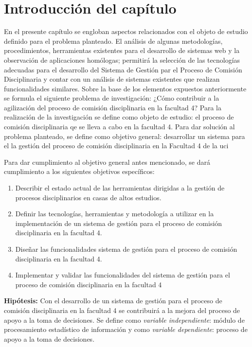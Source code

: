 \section[Introducción]{Introducción del capítulo}
En el presente capítulo se engloban aspectos relacionados con el objeto de estudio definido para el problema planteado. El análisis de algunas metodologías, procedimientos, herramientas existentes para el desarrollo de sistemas web y la observación de aplicaciones homólogas; permitirá la selección de las tecnologías adecuadas para el desarrollo del Sistema de Gestión par el Proceso de Comisión Disciplinaria y contar con un análisis de sistemas existentes que realizan funcionalidades similares.
Sobre la base de los elementos expuestos anteriormente se formula el siguiente problema de investigación: ¿Cómo contribuir a la agilización del proceso de comisión disciplinaria en la facultad 4? Para la realización de la investigación se define como objeto de estudio: el proceso de comisión disciplinaria qe se lleva a cabo en la facultad 4.
Para dar solución al problema planteado, se define como objetivo general: desarrollar un sistema para el la gestión del proceso de comisión disciplinaria en la Facultad 4 de la \ac{uci}

Para dar cumplimiento al objetivo general antes mencionado, se dará cumplimiento a los siguientes objetivos específicos:

\begin{enumerate}
	\item Describir el estado actual de las herramientas dirigidas a la gestión de procesos disciplinarios en casas de altos estudios.
	\item Definir las tecnologías, herramientas y metodología a utilizar en la implementación de un sistema de gestión para el proceso de comisión disciplinaria en la facultad 4.	\item Diseñar las funcionalidades sistema de gestión para el proceso de comisión disciplinaria en la facultad 4.
	\item Implementar y validar las funcionalidades del sistema de gestión para el proceso de comisión disciplinaria en la facultad 4
\end{enumerate}

\textbf{Hipótesis:}
Con el desarrollo de un sistema de gestión para el proceso de comisión disciplinaria en la facultad 4 se contribuirá a la mejora del proceso de apoyo a la toma de decisiones.
Se define como \emph{variable independiente}: módulo de procesamiento estadístico de información y como  \emph{variable dependiente}: proceso de apoyo a la toma de decisiones.
